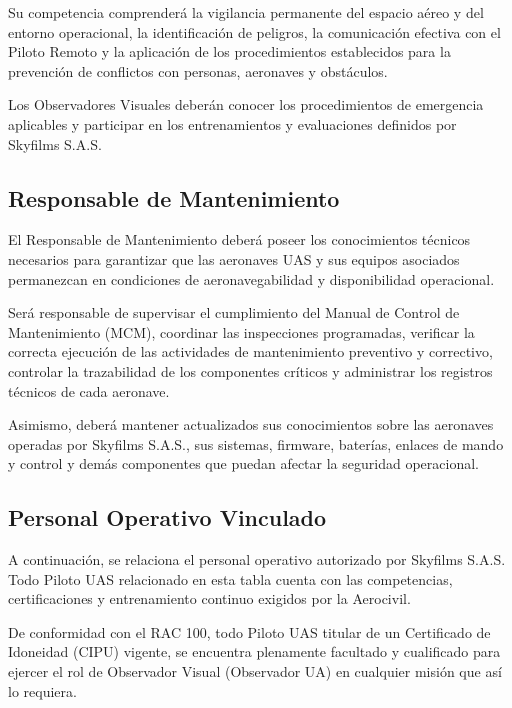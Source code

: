 Su competencia comprenderá la vigilancia permanente del espacio aéreo y del entorno operacional, la identificación de peligros, la comunicación efectiva con el Piloto Remoto y la aplicación de los procedimientos establecidos para la prevención de conflictos con personas, aeronaves y obstáculos.

Los Observadores Visuales deberán conocer los procedimientos de emergencia aplicables y participar en los entrenamientos y evaluaciones definidos por Skyfilms S.A.S.

\subsection{Responsable de Mantenimiento}

El Responsable de Mantenimiento deberá poseer los conocimientos técnicos necesarios para garantizar que las aeronaves UAS y sus equipos asociados permanezcan en condiciones de aeronavegabilidad y disponibilidad operacional.

Será responsable de supervisar el cumplimiento del Manual de Control de Mantenimiento (MCM), coordinar las inspecciones programadas, verificar la correcta ejecución de las actividades de mantenimiento preventivo y correctivo, controlar la trazabilidad de los componentes críticos y administrar los registros técnicos de cada aeronave.

Asimismo, deberá mantener actualizados sus conocimientos sobre las aeronaves operadas por Skyfilms S.A.S., sus sistemas, firmware, baterías, enlaces de mando y control y demás componentes que puedan afectar la seguridad operacional.


\subsection{Personal Operativo Vinculado}
A continuación, se relaciona el personal operativo autorizado por Skyfilms S.A.S. Todo Piloto UAS relacionado en esta tabla cuenta con las competencias, certificaciones y entrenamiento continuo exigidos por la Aerocivil.

\begin{tcolorbox}[title=Nota Operacional,colback=gray!5,colframe=black]
De conformidad con el RAC 100, todo Piloto UAS titular de un Certificado de Idoneidad (CIPU) vigente, se encuentra plenamente facultado y cualificado para ejercer el rol de Observador Visual (Observador UA) en cualquier misión que así lo requiera.

\end{tcolorbox}

